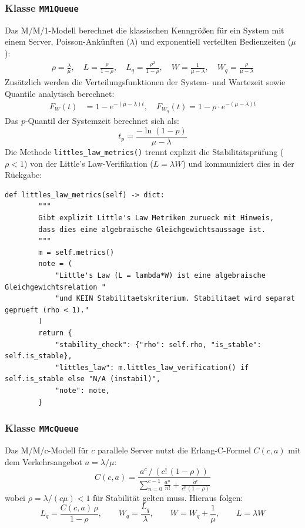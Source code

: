 ﻿\documentclass[a4paper,12pt]{scrreprt}
\theoremstyle{definition}
\begin{document}
\subsubsection{Klasse \texttt{MM1Queue}}

Das M/M/1-Modell berechnet die klassischen Kenngrößen für ein System
mit einem Server, Poisson-Ankünften ($\lambda$) und exponentiell
verteilten Bedienzeiten ($\mu$):
\begin{align}
	\rho = \frac{\lambda}{\mu}, \quad
	L = \frac{\rho}{1-\rho}, \quad
	L_q = \frac{\rho^2}{1-\rho}, \quad
	W = \frac{1}{\mu-\lambda}, \quad
	W_q = \frac{\rho}{\mu-\lambda}
\end{align}
Zusätzlich werden die Verteilungsfunktionen der System- und Wartezeit
sowie Quantile analytisch berechnet:
\begin{align}
	F_W(t) &= 1 - e^{-(\mu-\lambda)t}, \quad
	F_{W_q}(t) = 1 - \rho \cdot e^{-(\mu-\lambda)t}
\end{align}
Das $p$-Quantil der Systemzeit berechnet sich als:
\begin{equation}
	t_p = \frac{-\ln(1-p)}{\mu - \lambda}
\end{equation}
Die Methode \texttt{littles\_law\_metrics()} trennt explizit die Stabilitätsprüfung
($\rho < 1$) von der Little's Law-Verifikation ($L = \lambda W$) und
kommuniziert dies in der Rückgabe:

\begin{lstlisting}[style=python, caption={MM1Queue: Getrennte Stabilitäts- und Little's Law-Analyse}, label=lst:mm1-littles]
def littles_law_metrics(self) -> dict:
        """
        Gibt explizit Little's Law Metriken zurueck mit Hinweis,
        dass dies eine algebraische Gleichgewichtsaussage ist.
        """
        m = self.metrics()
        note = (
            "Little's Law (L = lambda*W) ist eine algebraische Gleichgewichtsrelation "
            "und KEIN Stabilitaetskriterium. Stabilitaet wird separat geprueft (rho < 1)."
        )
        return {
            "stability_check": {"rho": self.rho, "is_stable": self.is_stable},
            "littles_law": m.littles_law_verification() if self.is_stable else "N/A (instabil)",
            "note": note,
        }
\end{lstlisting}

\subsubsection{Klasse \texttt{MMcQueue}}

Das M/M/c-Modell für $c$ parallele Server nutzt die Erlang-C-Formel
$C(c, a)$ mit dem Verkehrsangebot $a = \lambda/\mu$:
\begin{equation}
	C(c, a) = \frac{a^c \,/\, (c!\,(1-\rho))}
	{\displaystyle\sum_{n=0}^{c-1} \frac{a^n}{n!} + \frac{a^c}{c!\,(1-\rho)}}
\end{equation}
wobei $\rho = \lambda/(c\mu) < 1$ für Stabilität gelten muss.
Hieraus folgen:
\begin{equation}
	L_q = \frac{C(c,a)\,\rho}{1-\rho}, \qquad
	W_q = \frac{L_q}{\lambda}, \qquad
	W = W_q + \frac{1}{\mu}, \qquad
	L = \lambda W
\end{equation}
\end{document}
